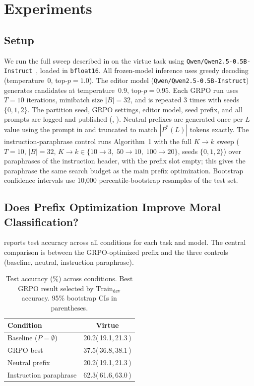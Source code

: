 \documentclass[preprint]{article}
\newcommand{\Traindev}{\text{Train}_{\text{dev}}}
\begin{document}
\section{Experiments}
\label{sec:experiments}

\subsection{Setup}

We run the full sweep described in  on the virtue task using \texttt{Qwen/Qwen2.5-0.5B-Instruct}~\citep{qwen2025}, loaded in \texttt{bfloat16}.
All frozen-model inference uses greedy decoding (temperature~$0$, top-$p = 1.0$).
The editor model (\texttt{Qwen/Qwen2.5-0.5B-Instruct}) generates candidates at temperature~$0.9$, top-$p = 0.95$.
Each GRPO run uses $T = 10$ iterations, minibatch size $|B| = 32$, and is repeated 3 times with seeds $\{0, 1, 2\}$.
The partition seed, GRPO settings, editor model, seed prefix, and all prompts are logged and published (, ).
Neutral prefixes are generated once per $L$ value using the prompt in  and truncated to match $|P^*(L)|$ tokens exactly.
The instruction-paraphrase control runs Algorithm~1 with the full $K{\to}k$ sweep ($T = 10$, $|B| = 32$, $K{\to}k \in \{10{\to}3,\; 50{\to}10,\; 100{\to}20\}$, seeds $\{0, 1, 2\}$) over paraphrases of the instruction header, with the prefix slot empty; this gives the paraphrase the same search budget as the main prefix optimization.
Bootstrap confidence intervals use 10{,}000 percentile-bootstrap resamples of the test set.

\subsection{Does Prefix Optimization Improve Moral Classification?}
\label{sec:does_it_improve}

 reports test accuracy across all conditions for each task and model.
The central comparison is between the GRPO-optimized prefix and the three controls (baseline, neutral, instruction paraphrase).

\begin{table}[t]
\centering
\caption{Test accuracy (\%) across conditions. Best GRPO result selected by $\Traindev$ accuracy. 95\% bootstrap CIs in parentheses.}
\label{tab:main_results}
\small
\begin{tabular}{lc}
\toprule
Condition & Virtue \\
\midrule
Baseline ($P{=}\emptyset$) & 20.2\;(\,19.1,\,21.3\,) \\
GRPO best & 37.5\;(\,36.8,\,38.1\,) \\
Neutral prefix & 20.2\;(\,19.1,\,21.3\,) \\
Instruction paraphrase & 62.3\;(\,61.6,\,63.0\,) \\
\bottomrule
\end{tabular}
\end{table}
\end{document}

